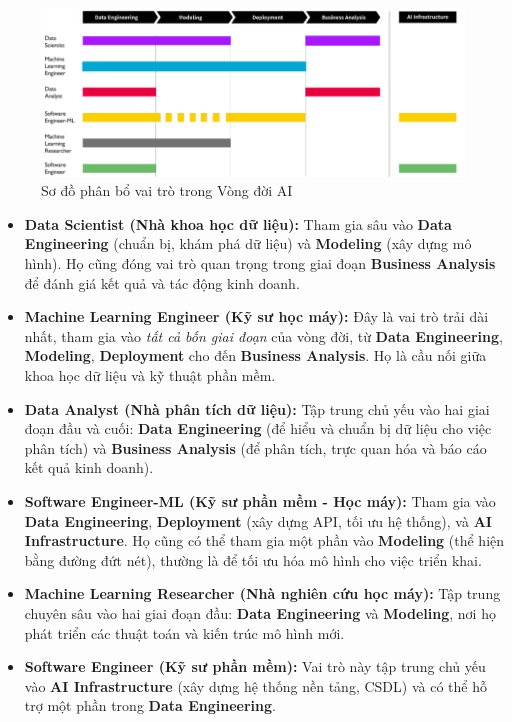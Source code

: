 \documentclass[11pt]{article}
\begin{document}
\begin{figure}[H]
    \centering
    \includegraphics[width=0.8\linewidth]{images/aiteam.png}
    \caption{Sơ đồ phân bổ vai trò trong Vòng đời AI}
\end{figure}

\begin{itemize}
    \item \textbf{Data Scientist (Nhà khoa học dữ liệu):} Tham gia sâu vào \textbf{Data Engineering} (chuẩn bị, khám phá dữ liệu) và \textbf{Modeling} (xây dựng mô hình). Họ cũng đóng vai trò quan trọng trong giai đoạn \textbf{Business Analysis} để đánh giá kết quả và tác động kinh doanh.

    \item \textbf{Machine Learning Engineer (Kỹ sư học máy):} Đây là vai trò trải dài nhất, tham gia vào \textit{tất cả bốn giai đoạn} của vòng đời, từ \textbf{Data Engineering}, \textbf{Modeling}, \textbf{Deployment} cho đến \textbf{Business Analysis}. Họ là cầu nối giữa khoa học dữ liệu và kỹ thuật phần mềm.

    \item \textbf{Data Analyst (Nhà phân tích dữ liệu):} Tập trung chủ yếu vào hai giai đoạn đầu và cuối: \textbf{Data Engineering} (để hiểu và chuẩn bị dữ liệu cho việc phân tích) và \textbf{Business Analysis} (để phân tích, trực quan hóa và báo cáo kết quả kinh doanh).

    \item \textbf{Software Engineer-ML (Kỹ sư phần mềm - Học máy):} Tham gia vào \textbf{Data Engineering}, \textbf{Deployment} (xây dựng API, tối ưu hệ thống), và \textbf{AI Infrastructure}. Họ cũng có thể tham gia một phần vào \textbf{Modeling} (thể hiện bằng đường đứt nét), thường là để tối ưu hóa mô hình cho việc triển khai.

    \item \textbf{Machine Learning Researcher (Nhà nghiên cứu học máy):} Tập trung chuyên sâu vào hai giai đoạn đầu: \textbf{Data Engineering} và \textbf{Modeling}, nơi họ phát triển các thuật toán và kiến trúc mô hình mới.

    \item \textbf{Software Engineer (Kỹ sư phần mềm):} Vai trò này tập trung chủ yếu vào \textbf{AI Infrastructure} (xây dựng hệ thống nền tảng, CSDL) và có thể hỗ trợ một phần trong \textbf{Data Engineering}.
\end{itemize}
\end{document}
